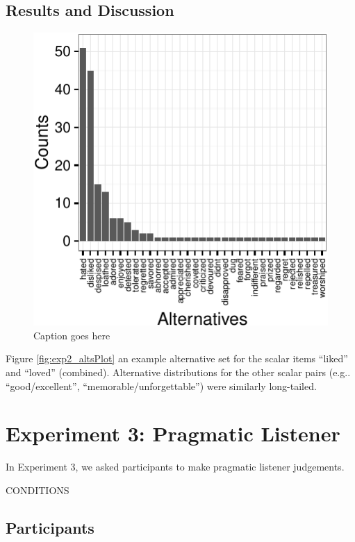 \documentclass[10pt, letterpaper]{article}
\newenvironment{CodeChunk}{}{}
\begin{document}
\subsection{Results and Discussion}\label{results-and-discussion-1}

\begin{CodeChunk}
\begin{figure}[t]

{\centering \includegraphics{figs/exp2_altsPlot_likedLoved-1} 

}

\caption[Caption goes here]{Caption goes here}\label{fig:exp2_altsPlot_likedLoved}
\end{figure}
\end{CodeChunk}

Figure \ref{fig:exp2_altsPlot} an example alternative set for the scalar
items ``liked'' and ``loved'' (combined). Alternative distributions for
the other scalar pairs (e.g.. ``good/excellent'',
``memorable/unforgettable'') were similarly long-tailed.

\section{Experiment 3: Pragmatic
Listener}\label{experiment-3-pragmatic-listener}

In Experiment 3, we asked participants to make pragmatic listener
judgements.

CONDITIONS

\subsection{Participants}\label{participants-2}
\end{document}
